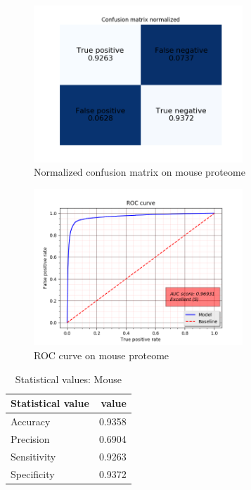 \begin{figure}[H]
\center
\includegraphics[width=0.7\textwidth]{pictures/mouse_cm_normalized.png}
\caption{\label{fig:mouse_normalized_cm}Normalized confusion matrix on mouse proteome}
\end{figure}

\begin{figure}[H]
\center
\includegraphics[width=0.7\textwidth]{pictures/mouse_roc.png}
\caption{\label{fig:mouse_roc}ROC curve on mouse proteome}
\end{figure}

\begin{table}[H]
\centering
\begin{tabular}{l | r} %
Statistical value & value\\\hline
Accuracy & 0.9358 \\
Precision & 0.6904 \\
Sensitivity & 0.9263 \\
Specificity & 0.9372 \\
\end{tabular}
\caption{\label{tab:mouse_stat_table}Statistical values: Mouse}
\end{table}


